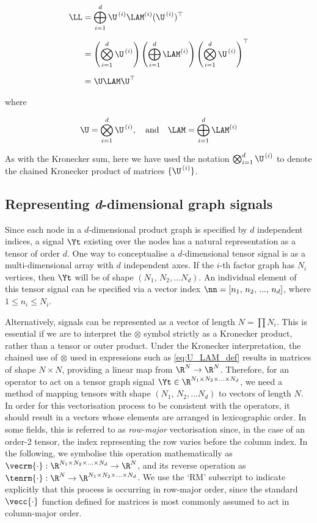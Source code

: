 \begin{align}
    \LL &= \bigoplus_{i=1}^d \U^{\,(i)} \LAM^{(i)} (\U^{\,(i)})^\top \notag \\[0.2cm]
    &= \left( \bigotimes_{i=1}^d  \U^{\,(i)} \right) \left(\bigoplus_{i=1}^d \LAM^{(i)} \right) \left(\bigotimes_{i=1}^d  \U^{\,(i)} \right)^\top \notag \\[0.2cm]
    &= \U \LAM \U^\top 
\end{align}

\noindent where 

\begin{equation}
    \label{eq:U_LAM_def}
    \U =  \bigotimes_{i=1}^d  \U^{\,(i)} , \quad \text{and} \quad \LAM =  \bigoplus_{i=1}^d \LAM^{(i)}
\end{equation}


As with the Kronecker sum, here we have used the notation $\bigotimes_{i=1}^d  \U^{\,(i)}$ to denote the chained Kronecker product of matrices $\{\U^{\,(i)}  \}$. 

\subsection{Representing \textit{d}-dimensional graph signals}

Since each node in a $d$-dimensional product graph is specified by $d$ independent indices, a signal $\Yt$ existing over the nodes has a natural representation as a tensor of order $d$. One way to conceptualise a $d$-dimensional tensor signal is as a multi-dimensional array with $d$ independent axes. If the $i$-th factor graph has $N_i$ vertices, then $\Yt$ will be of shape $(N_1, \, N_2 , ... N_d)$. An individual element of this tensor signal can be specified via a vector index $\nn = [n_1,\, n_2,\, ...,\, n_d]$, where $1\leq n_i \leq N_i$.

Alternatively, signals can be represented as a vector of length $N = \prod N_i$. This is essential if we are to interpret the $\otimes$ symbol strictly as a Kronecker product, rather than a tensor or outer product. Under the Kronecker interpretation, the chained use of $\otimes$ used in expressions such as \cref{eq:U_LAM_def} results in matrices of shape $N \times N$, providing a linear map from $\R^{N} \rightarrow \R^{N}$. Therefore, for an operator to act on a tensor graph signal $\Yt \in \R^{N_1 \times N_2 \times ... \times N_d}$, we need a method of mapping tensors with shape $(N_1, \, N_2 , ... N_d)$ to vectors of length $N$. In order for this vectorisation process to be consistent with the operators, it should result in a vectors whose elements are arranged in lexicographic order. In some fields, this is referred to as \textit{row-major} vectorisation since, in the case of an order-2 tensor, the index representing the row varies before the column index. In the following, we symbolise this operation mathematically as $\vecrm{\cdot}: \R^{N_1 \times N_2 \times ... \times N_d} \rightarrow \R^N$, and its reverse operation as $\tenrm{\cdot}: \R^N \rightarrow \R^{N_1 \times N_2 \times ... \times N_d}$. We use the `RM' subscript to indicate explicitly that this process is occurring in row-major order, since the standard $\vecc{\cdot}$ function defined for matrices is most commonly assumed to act in column-major order.  

